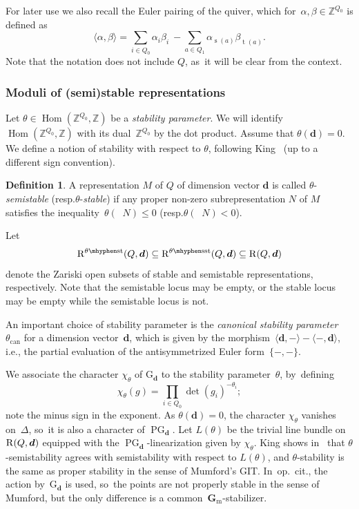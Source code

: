 \documentclass[11pt]{article}
\newcommand{\resp}{resp.\xspace}
\theoremstyle{plain}
\theoremstyle{definition}
\newtheorem{definition}[theorem]{Definition}
\DeclareMathOperator\dimvect{\underline{\operatorname{dim}}}
\DeclareMathOperator\Hom{Hom}
\DeclareMathOperator\PG{PG}
\DeclareMathOperator\source{s}
\DeclareMathOperator\target{t}
\newcommand\can{\ensuremath{\mathrm{can}}}
\newcommand\dash{\nobreakdash-\hspace{0pt}}
\newcommand\Gm{\ensuremath{\mathbf{G}_{\mathrm{m}}}}
\newcommand\group[1][\tuple{d}]{\mathrm{G}_{#1}}
\newcommand\semistable{\ensuremath{\mhyphen\mathrm{sst}}}
\newcommand\stable{\ensuremath{\mhyphen\mathrm{st}}}
\newcommand\tuple[1]{\ensuremath{{\boldsymbol{#1}}}}
\begin{document}
For later use we also recall the Euler pairing of the quiver,
which for~$\alpha, \beta \in \mathbb{Z}^{Q_0}$
is defined as
\begin{equation*}
\langle \alpha, \beta \rangle = \sum_{i \in Q_0} \alpha_i \beta_i ~- \sum_{a \in Q_1} \alpha_{\source(a)} \beta_{\target(a)}.
\end{equation*}
Note that the notation does not include $Q$, as~it will be clear from the context.

\subsubsection*{Moduli of (semi)stable representations}
Let $\theta\in\Hom(\mathbb{Z}^{Q_0},\mathbb{Z})$ be a \emph{stability parameter}.
We will identify $\Hom(\mathbb{Z}^{Q_0},\mathbb{Z})$ with its dual~$\mathbb{Z}^{Q_0}$ by the dot product.
Assume that $\theta(\tuple{d}) = 0$.
We define a notion of stability with respect to $\theta$,
following King~\cite{MR1315461} (up to a different sign convention).
\begin{definition}
\label{definition:semistability}
A representation $M$ of $Q$ of dimension vector $\tuple{d}$
is called $\theta$\nobreakdash-\emph{semistable} (\resp $\theta$\dash\emph{stable})
if any proper non-zero subrepresentation $N$ of $M$
satisfies the inequality~$\theta(\dimvect N) \leq 0$ (\resp $\theta(\dimvect N) < 0$).
\end{definition}

Let
\begin{equation*}
\repspace[\theta\stable]{Q,\tuple{d}}
\subseteq\repspace[\theta\semistable]{Q,\tuple{d}}
\subseteq\repspace{Q,\tuple{d}}
\end{equation*}
denote the Zariski open subsets of stable and semistable representations, respectively.
Note that the semistable locus may be empty,
or the stable locus may be empty while the semistable locus is not.

An important choice of stability parameter is
the \emph{canonical stability parameter}~$\theta_\can$ for a dimension vector~$\tuple{d}$,
which is given by the morphism~$\langle\tuple{d},-\rangle-\langle-,\tuple{d}\rangle$,
i.e.,
the partial evaluation of the antisymmetrized Euler form~$\{-,-\}$.

We associate the character $\chi_\theta$ of $\group$
to the stability parameter~$\theta$, by~defining
\begin{equation*}
\chi_\theta(g) = \prod_{i \in Q_0} \det(g_i)^{-\theta_i};
\end{equation*}
note the minus sign in the exponent.
As $\theta(\tuple{d}) = 0$,
the character $\chi_{\theta}$ vanishes on~$\Delta$, so~it is also a character of $\PG_{\tuple{d}}$.
Let $L(\theta)$ be the trivial line bundle on $\repspace{Q,\tuple{d}}$
equipped with the $\PG_\tuple{d}$-linearization given by $\chi_\theta$.
King shows in~\cite[Th.\,4.1]{MR1315461} that $\theta$-semistability
agrees with semistability with respect to $L(\theta)$,
and $\theta$-stability is the same as proper stability in the sense of Mumford's GIT. In~op.~cit., the action by~$\group$ is used, so~the points are not properly stable in the sense of Mumford,
but the only difference is a common~$\Gm$-stabilizer.
\end{document}
